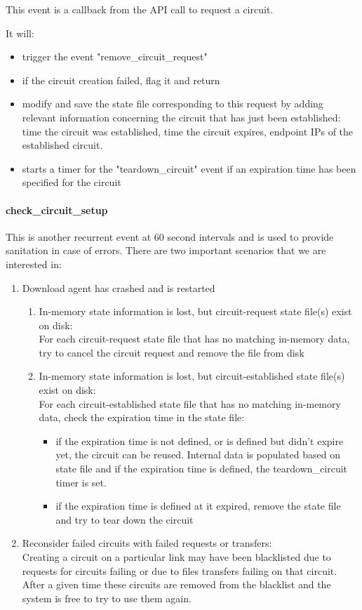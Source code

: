 This event is a callback from the API call to request a circuit.

It will:
\begin{itemize}
  \item trigger the event "remove\_circuit\_request"
  \item if the circuit creation failed, flag it and return
  \item modify and save the state file corresponding to this request by
adding relevant information concerning the circuit that has just been established:
time the circuit was established, time the circuit expires, endpoint IPs of 
the established circuit.
  \item starts a timer for the "teardown\_circuit" event if an expiration
time has been specified for the circuit
\end{itemize}

\paragraph{check\_circuit\_setup}

This is another recurrent event at 60 second intervals and is used to provide
sanitation in case of errors. There are two important scenarios that we are interested in:
\begin{enumerate}
  \item Download agent has crashed and is restarted
  \begin{enumerate}
    \item In-memory state information is lost, but circuit-request state file(s) exist on disk:\\
			For each circuit-request state file that has no matching in-memory data,
			try to cancel the circuit request and remove the file from disk
    \item In-memory state information is lost, but circuit-established state file(s) exist on disk:\\
			For each circuit-established state file that has no matching in-memory data,
			check the expiration time in the state file:
			\begin{itemize}
			  \item if the expiration time is not defined, or is defined but didn't expire yet,
					  the circuit can be reused. Internal data is populated based on state
					 file and if the expiration time is defined, the teardown\_circuit timer is
					 set.
			  \item if the expiration time is defined at it expired, remove the state file and
					 try to tear down the circuit 
			\end{itemize}
  \end{enumerate}
  \item Reconsider failed circuits with failed requests or transfers:\\
		  Creating a circuit on a particular link may have been blacklisted due to requests
		  for circuits failing or due to files transfers failing on that circuit. After a given
		  time these circuits are removed from the blacklist and the system is free to try
		  to use them again.
\end{enumerate}


